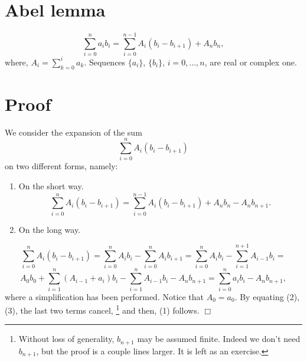 \documentclass[12pt]{article}
\begin{document}
\section{Abel lemma}
\begin{equation}
\sum_{i=0}^n a_ib_i=\sum_{i=0}^{n-1} A_i(b_i-b_{i+1})+A_nb_n,
\end{equation}
where, $A_i=\sum_{k=0}^i a_k$. Sequences $\{a_i\}$, $\{b_i\}$, $i=0,\dots, n$, are real or complex one.
\section{Proof}
We consider the expansion of the sum
\begin{equation*}
\sum_{i=0}^n A_i(b_i-b_{i+1})
\end{equation*}
on two different forms, namely:
\begin{enumerate}
\item On the short way.
\begin{equation}
\sum_{i=0}^n A_i(b_i-b_{i+1})=\sum_{i=0}^{n-1} A_i(b_i-b_{i+1})+A_nb_n-A_nb_{n+1}.
\end{equation}
\item On the long way.
\end{enumerate}
\begin{equation*}
\sum_{i=0}^n A_i(b_i-b_{i+1})=\sum_{i=0}^n A_ib_i-\sum_{i=0}^n A_ib_{i+1}=
\sum_{i=0}^n A_ib_i-\sum_{i=1}^{n+1} A_{i-1}b_i=
\end{equation*}
\begin{equation}
A_0 b_0+\sum_{i=1}^n (A_{i-1}+a_i)b_i-\sum_{i=1}^n A_{i-1}b_i-A_nb_{n+1}=\sum_{i=0}^n a_ib_i-A_nb_{n+1},
\end{equation}
where a simplification has been performed. Notice that $A_0=a_0$. By equating (2), (3), the last two terms cancel, {\footnote{Without loss of generality, $b_{n+1}$ may be assumed finite. Indeed we don't need $b_{n+1}$, but the proof is a couple lines larger. It is left as an exercise.}} and then, (1) follows. $\Box$



\end{document}
